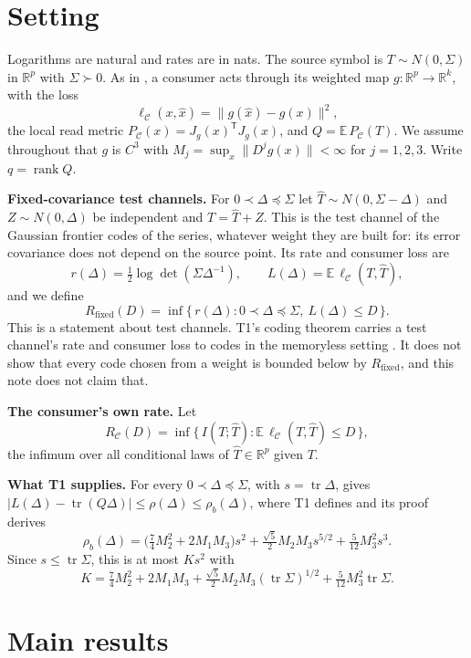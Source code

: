 \documentclass[11pt,onecolumn]{IEEEtran}
\newcommand{\E}{\mathbb{E}}
\newcommand{\R}{\mathbb{R}}
\newcommand{\tr}{\operatorname{tr}}
\newcommand{\PC}{P_{\mathcal C}}
\newcommand{\Rfix}{R_{\mathrm{fixed}}}
\newcommand{\RC}{R_{\mathcal C}}
\begin{document}
\section{Setting}\label{sec:setting}

Logarithms are natural and rates are in nats. The source symbol is $T\sim N(0,\Sigma)$ in
$\R^p$ with $\Sigma\succ0$. As in \cite{t1}, a consumer acts through its weighted map
$g:\R^p\to\R^k$, with the loss
\[
\ell_{\mathcal C}(x,\hat x)=\|g(\hat x)-g(x)\|^2 ,
\]
the local read metric $\PC(x)=J_g(x)^{\mathsf T}J_g(x)$, and $Q=\E\,\PC(T)$. We assume
throughout that $g$ is $C^3$ with $M_j=\sup_x\|D^jg(x)\|<\infty$ for $j=1,2,3$. Write
$q=\operatorname{rank}Q$.

\textbf{Fixed-covariance test channels.} For $0\prec\Delta\preceq\Sigma$ let
$\hat T\sim N(0,\Sigma-\Delta)$ and $Z\sim N(0,\Delta)$ be independent and $T=\hat T+Z$.
This is the test channel of the Gaussian frontier codes of the series, whatever weight
they are built for: its error covariance does not depend on the source point. Its rate
and consumer loss are
\[
r(\Delta)=\tfrac12\log\det(\Sigma\Delta^{-1}),\qquad
L(\Delta)=\E\,\ell_{\mathcal C}(T,\hat T),
\]
and we define
\[
\Rfix(D)=\inf\{\,r(\Delta):0\prec\Delta\preceq\Sigma,\ L(\Delta)\le D\,\}.
\]
This is a statement about test channels. T1's coding theorem carries a test channel's
rate and consumer loss to codes in the memoryless setting \cite[Theorem ``From test
channels to codes'']{t1}. It does not show that every code chosen from a weight is bounded
below by $\Rfix$, and this note does not claim that.

\textbf{The consumer's own rate.} Let
\[
\RC(D)=\inf\{\,I(T;\hat T):\E\,\ell_{\mathcal C}(T,\hat T)\le D\,\},
\]
the infimum over all conditional laws of $\hat T\in\R^p$ given $T$.

\textbf{What T1 supplies.} For every $0\prec\Delta\preceq\Sigma$, with $s=\tr\Delta$,
\cite[Theorem ``The test channel is exact to second order'']{t1} gives
$|L(\Delta)-\tr(Q\Delta)|\le\rho(\Delta)\le\rho_b(\Delta)$, where T1 defines and its
proof derives
\[
\rho_b(\Delta)=\bigl(\tfrac74M_2^2+2M_1M_3\bigr)s^2+\tfrac{\sqrt5}2M_2M_3s^{5/2}
+\tfrac5{12}M_3^2s^3 .
\]
Since $s\le\tr\Sigma$, this is at most $Ks^2$ with
\begin{equation}\label{eq:K}
K=\tfrac74M_2^2+2M_1M_3+\tfrac{\sqrt5}2M_2M_3(\tr\Sigma)^{1/2}+\tfrac5{12}M_3^2\tr\Sigma .
\end{equation}

\section{Main results}
\end{document}
